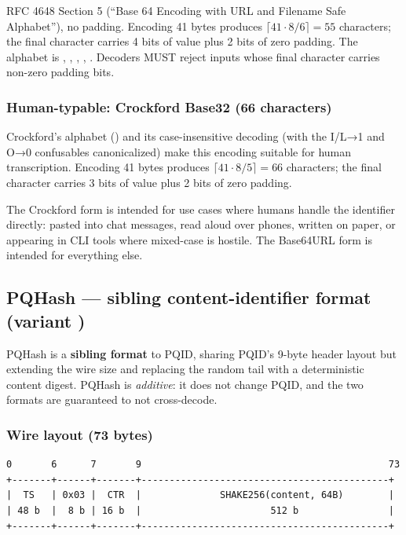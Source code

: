 RFC 4648 Section 5 (``Base 64 Encoding with URL and Filename Safe Alphabet''), no padding. Encoding 41 bytes produces $\lceil 41 \cdot 8 / 6 \rceil = 55$ characters; the final character carries 4 bits of value plus 2 bits of zero padding. The alphabet is , , , \code{-}, \code{\_}. Decoders MUST reject inputs whose final character carries non-zero padding bits.

\subsubsection{Human-typable: Crockford Base32 (66 characters)}

Crockford's alphabet () and its case-insensitive decoding (with the I/L→1 and O→0 confusables canonicalized) make this encoding suitable for human transcription. Encoding 41 bytes produces $\lceil 41 \cdot 8 / 5 \rceil = 66$ characters; the final character carries 3 bits of value plus 2 bits of zero padding.

The Crockford form is intended for use cases where humans handle the identifier directly: pasted into chat messages, read aloud over phones, written on paper, or appearing in CLI tools where mixed-case is hostile. The Base64URL form is intended for everything else.

\subsection{PQHash --- sibling content-identifier format (variant )}
\label{sec:pqhash}

PQHash is a \textbf{sibling format} to PQID, sharing PQID's 9-byte header layout but extending the wire size and replacing the random tail with a deterministic content digest. PQHash is \emph{additive}: it does not change PQID, and the two formats are guaranteed to not cross-decode.

\subsubsection{Wire layout (73 bytes)}

\begin{lstlisting}
0       6      7       9                                            73
+-------+------+-------+--------------------------------------------+
|  TS   | 0x03 |  CTR  |              SHAKE256(content, 64B)        |
| 48 b  |  8 b | 16 b  |                       512 b                |
+-------+------+-------+--------------------------------------------+
\end{lstlisting}

